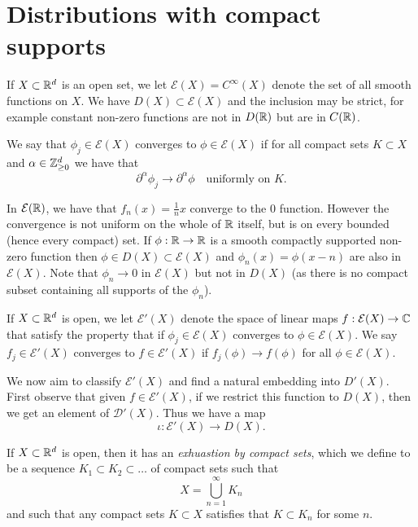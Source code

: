 \documentclass[twoside, a4paper, 10pt]{amsart}
\begin{document}
\section{Distributions with compact supports}

If $X \subset \mathbb{R}^d$ is an open set, we let $\mathcal{E}(X) = C^{\infty}(X)$ denote the set of all smooth functions on $X$. We have $D(X) \subset \mathcal{E}(X)$ and the inclusion may be strict, for example constant non-zero functions are not in $D(\mathbb{R})$ but are in $C(\mathbb{R})$.

\begin{mydef} We say that $\phi_j \in \mathcal{E}(X)$ converges to $\phi \in \mathcal{E}(X)$ if for all compact sets $K \subset X$ and $\alpha \in \mathbb{Z}_{\geq 0}^d$ we have that $$\partial^{\alpha}\phi_j \to \partial^{\alpha}\phi \quad \text{uniformly on } K. $$

\end{mydef}

\begin{eg} In $\mathcal{E}(\mathbb{R})$, we have that $f_n(x) = \frac{1}{n}x$ converge to the $0$ function. However the convergence is not uniform on the whole of $\mathbb{R}$ itself, but is on every bounded (hence every compact) set. If $\phi:\mathbb{R} \to \mathbb{R}$ is a smooth compactly supported non-zero function then $\phi \in D(X) \subset \mathcal{E}(X)$ and $\phi_n(x) = \phi(x-n)$ are also in $\mathcal{E}(X)$. Note that $\phi_n \to 0$ in $\mathcal{E}(X)$ but not in $D(X)$ (as there is no compact subset containing all supports of the $\phi_n$). \end{eg}

\begin{mydef} If $X \subset \mathbb{R}^d$ is open, we let $\mathcal{E}'(X)$ denote the space of linear maps $f:\mathcal{E}(X) \to \mathbb{C}$ that satisfy the property that if $\phi_j \in \mathcal{E}(X)$ converges to $\phi \in \mathcal{E}(X)$. We say $f_j \in \mathcal{E}'(X)$ converges to $f \in \mathcal{E}'(X)$ if $f_j(\phi) \to f(\phi)$ for all $\phi \in \mathcal{E}(X)$.

\end{mydef}

We now aim to classify $\mathcal{E}'(X)$ and find a natural embedding into $D'(X)$. First observe that given $f \in \mathcal{E}'(X)$, if we restrict this function to $D(X)$, then we get an element of $\mathcal{D}'(X)$. Thus we have a map $$\iota:\mathcal{E}'(X) \to D(X).$$

\begin{lemma} If $X \subset \mathbb{R}^d$ is open, then it has an \textit{exhuastion by compact sets}, which we define to be a sequence $K_1 \subset K_2 \subset \ldots$ of compact sets such that $$X = \bigcup_{n=1}^{\infty} K_n$$ and such that any compact sets $K \subset X$ satisfies that $K \subset K_n$ for some $n$.

\end{lemma}
\end{document}
